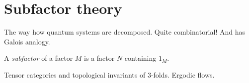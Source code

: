 \documentclass{../note}
\begin{document}
\part{Subfactor theory}






The way how quantum systems are decomposed.
Quite combinatorial!
And has Galois analogy.

\begin{prb}
A \emph{subfactor} of a factor $M$ is a factor $N$ containing $1_M$.
\end{prb}

Tensor categories and topological invariants of 3-folds.
Ergodic flows.
\end{document}
